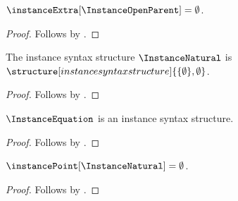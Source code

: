 \begin{proposition}\label{instance_richer_projection_available}
    $\instanceExtra[\InstanceOpenParent]=\emptyset$.
\end{proposition}
\begin{proof}
    Follows by .
\end{proof}

\begin{instance}\label{instance_natural_surface}
    The instance syntax structure $\InstanceNatural$ is
    $\structure[instance syntax structure]
        {\{\emptyset\},\emptyset}$.
\end{instance}
\begin{proof}
    Follows by
    .
\end{proof}

\begin{proposition}\label{instance_marker_is_complete_fact}
    $\InstanceEquation$ is an instance syntax structure.
\end{proposition}
\begin{proof}
    Follows by .
\end{proof}

\begin{proposition}\label{instance_projection_available}
    $\instancePoint[\InstanceNatural]=\emptyset$.
\end{proposition}
\begin{proof}
    Follows by .
\end{proof}
